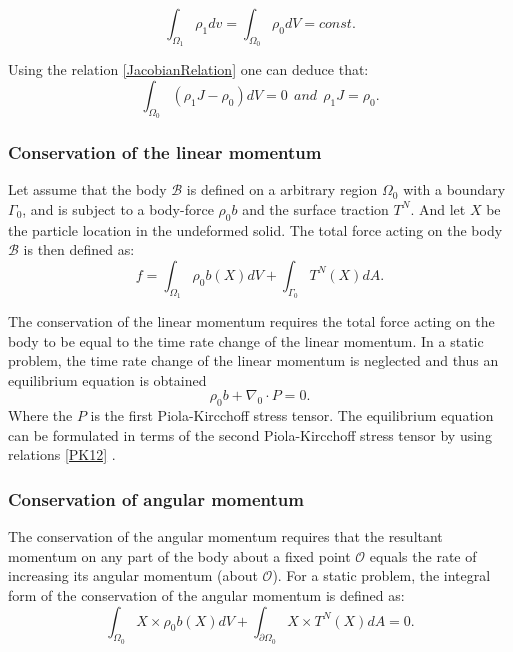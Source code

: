 \begin{equation}
\int_{\Omega_1} \rho_1 dv = \int_{\Omega_0} \rho_0 dV = const. 
\end{equation}


Using the relation \ref{JacobianRelation} one can deduce that:
\begin{equation}
\int_{\Omega_0} \left( \rho_1 J - \rho_0\right)dV = 0 \  \ and \  \ \rho_1 J = \rho_0.
\end{equation}
\subsubsection*{Conservation of the linear momentum}
Let assume that the body $\mathcal{B}$ is defined on a arbitrary region $\Omega_0$ with a boundary $\Gamma_0$, and is subject to a body-force $\rho_0  b$ and the surface traction $T^N$. And let $X$ be the particle location in the undeformed solid.
 The total force acting on the body $\mathcal{B}$ is then defined as:
\begin{equation}
f = \int_{\Omega_1}\rho_0 b(X)dV + \int_{\Gamma_0} T^N(X)dA.
\end{equation}
 
The conservation of the linear momentum requires the total force acting on the body to be equal to the time rate change of the linear momentum. In a static problem, the time rate change of the linear momentum is neglected and thus an equilibrium equation is obtained
\begin{equation}
\rho_0 b+\nabla_0 \cdot P  = 0.
\end{equation}
Where the $P$ is the first Piola-Kircchoff stress tensor.	
The equilibrium equation can be formulated in terms of the second Piola-Kircchoff stress tensor by using relations \ref{PK12} .
\subsubsection*{Conservation of angular momentum}
The conservation of the angular momentum requires that the resultant momentum on any part of the body about a fixed point $\mathcal{O}$ equals the rate of increasing its angular momentum (about $\mathcal{O}$). For a static problem, the integral form of the conservation of the angular momentum is defined as:
\begin{equation}
\label{angularMomentum}
\int_{\Omega_0} X \times \rho_0 b(X)dV + \int_{\partial \Omega_0} X \times  T^N(X)dA = 0.
\end{equation}

